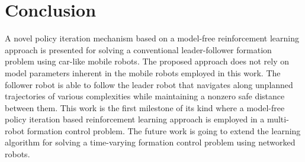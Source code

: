 \documentclass[letterpaper]{article} %
\begin{document}


%
%


\section{Conclusion} \label{sec:conclusion}

A novel policy iteration mechanism based on a model-free reinforcement learning approach is presented for solving a conventional leader-follower formation problem using car-like mobile robots. The proposed approach does not rely on model parameters inherent in the mobile robots employed in this work. The follower robot is able to follow the leader robot that navigates along unplanned trajectories of various complexities while maintaining a nonzero safe distance between them. This work is the first milestone of its kind where a model-free policy iteration based reinforcement learning approach is employed in a multi-robot formation control problem. The future work is going  to extend the learning algorithm for solving a time-varying formation control problem using networked robots.    



\end{document}
